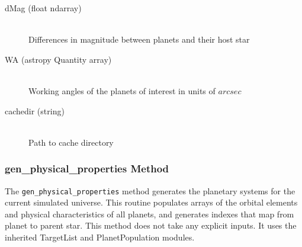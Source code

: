 \documentclass[cleanfoot]{asme2ej}
\begin{document}
\begin{itemize}
\begin{description}
    \item[dMag (float ndarray)] \hfill \\ Differences in magnitude between planets and their host star
    \item[WA (astropy Quantity array)] \hfill \\ Working angles of the planets of interest in units of $arcsec$
    \item[cachedir (string)] \hfill \\ Path to cache directory
\end{description}
\end{itemize}

\subsubsection{gen\_physical\_properties Method} \label{sec:genphysicalpropertiestask}
The \verb+gen_physical_properties+ method generates the planetary systems for the current simulated universe. This routine populates arrays of the orbital elements and physical characteristics of all planets, and generates indexes that map from planet to parent star. This method does not take any explicit inputs.  It uses the inherited TargetList and PlanetPopulation modules.
\end{document}
